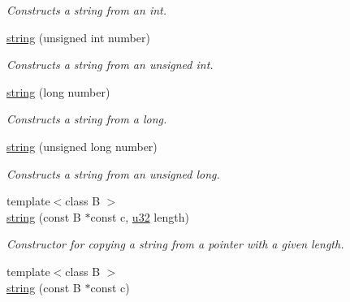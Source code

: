 \begin{DoxyCompactItemize}
\begin{DoxyCompactList}\small\item\em Constructs a string from an int. \end{DoxyCompactList}\item 
\hyperlink{classirr_1_1core_1_1string_aa4130758409d44fae8701533a979f897}{string} (unsigned int number)\hypertarget{classirr_1_1core_1_1string_aa4130758409d44fae8701533a979f897}{}\label{classirr_1_1core_1_1string_aa4130758409d44fae8701533a979f897}

\begin{DoxyCompactList}\small\item\em Constructs a string from an unsigned int. \end{DoxyCompactList}\item 
\hyperlink{classirr_1_1core_1_1string_a1ba5469e179b7da58f04e170d6d52f30}{string} (long number)\hypertarget{classirr_1_1core_1_1string_a1ba5469e179b7da58f04e170d6d52f30}{}\label{classirr_1_1core_1_1string_a1ba5469e179b7da58f04e170d6d52f30}

\begin{DoxyCompactList}\small\item\em Constructs a string from a long. \end{DoxyCompactList}\item 
\hyperlink{classirr_1_1core_1_1string_a29ca159309beaa7566d349304e1ce0ae}{string} (unsigned long number)\hypertarget{classirr_1_1core_1_1string_a29ca159309beaa7566d349304e1ce0ae}{}\label{classirr_1_1core_1_1string_a29ca159309beaa7566d349304e1ce0ae}

\begin{DoxyCompactList}\small\item\em Constructs a string from an unsigned long. \end{DoxyCompactList}\item 
{\footnotesize template$<$class B $>$ }\\\hyperlink{classirr_1_1core_1_1string_a8c9f9dc980a9ab0eca9fe4f3e1ae6b80}{string} (const B $\ast$const c, \hyperlink{namespaceirr_a0416a53257075833e7002efd0a18e804}{u32} length)\hypertarget{classirr_1_1core_1_1string_a8c9f9dc980a9ab0eca9fe4f3e1ae6b80}{}\label{classirr_1_1core_1_1string_a8c9f9dc980a9ab0eca9fe4f3e1ae6b80}

\begin{DoxyCompactList}\small\item\em Constructor for copying a string from a pointer with a given length. \end{DoxyCompactList}\item 
{\footnotesize template$<$class B $>$ }\\\hyperlink{classirr_1_1core_1_1string_a6f25cda3e9285958b4e7a7eb01d693a7}{string} (const B $\ast$const c)\hypertarget{classirr_1_1core_1_1string_a6f25cda3e9285958b4e7a7eb01d693a7}{}\label{classirr_1_1core_1_1string_a6f25cda3e9285958b4e7a7eb01d693a7}


\end{DoxyCompactItemize}
